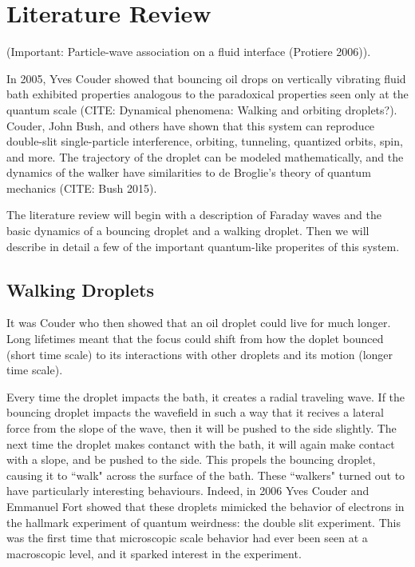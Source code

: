 	\section{Literature Review}
	
(Important: Particle-wave association on a fluid interface (Protiere 2006)).
	    
	    In 2005, Yves Couder showed that bouncing oil drops on vertically vibrating fluid bath exhibited properties analogous to the paradoxical properties seen only at the quantum scale (CITE: Dynamical phenomena:  Walking and orbiting droplets?). Couder, John Bush, and others have shown that this system can reproduce double-slit single-particle interference, orbiting, tunneling, quantized orbits, spin, and more. The trajectory of the droplet can be modeled mathematically, and the dynamics of the walker have similarities to de Broglie's theory of quantum mechanics (CITE: Bush 2015).
	    
	    The literature review will begin with a description of Faraday waves and the basic dynamics of a bouncing droplet and a walking droplet. Then we will describe in detail a few of the important quantum-like properites of this system.
	    
	    	    \subsection{Walking Droplets}
	    
	       It was Couder who then showed that an oil droplet could live for much longer. Long lifetimes meant that the focus could shift from how the doplet bounced (short time scale) to its interactions with other droplets and its motion (longer time scale).
	       
	       Every time the droplet impacts the bath, it creates a radial traveling wave. If the bouncing droplet impacts the wavefield in such a way that it recives a lateral force from the slope of the wave, then it will be pushed to the side slightly. The next time the droplet makes contanct with the bath, it will again make contact with a slope, and be pushed to the side. This propels the bouncing droplet, causing it to ``walk" across the surface of the bath. These ``walkers" turned out to have particularly interesting behaviours. Indeed, in 2006 Yves Couder and Emmanuel Fort showed that these droplets mimicked the behavior of electrons in the hallmark experiment of quantum weirdness: the double slit experiment. This was the first time that microscopic scale behavior had ever been seen at a macroscopic level, and it sparked interest in the experiment.
	    
